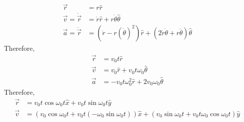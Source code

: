 \documentclass[fleqn]{article}
\begin{document}
\begin{align*}
\overrightarrow{r} &= r \hat{r} \\
\overrightarrow{v} = \dot{\overrightarrow{r}} &= \dot{r} \hat{r} + r \dot{\theta} \hat{\theta} \\
\overrightarrow{a} = \ddot{\overrightarrow{r}} &= \left(\ddot{r} - r(\dot{\theta})^2\right) \hat{r} + \left(2 \dot{r} \dot{\theta} + r \ddot{\theta}\right) \hat{\theta}
\end{align*}
Therefore,
\begin{align*}
	\overrightarrow{r} &= v_0 t \hat{r} \\
	\overrightarrow{v} &= v_0 \hat{r} + v_0 t \omega_0 \hat{\theta} \\
	\overrightarrow{a} &= - v_0 t \omega_0^2 \hat{r} + 2 v_0 \omega_0 \hat{\theta}
\end{align*}
Therefore, 
\begin{align*}
	\overrightarrow{r} &= v_0 t \cos \omega_0 t \hat{x} + v_0 t \sin \omega_0 t \hat{y} \\
	\overrightarrow{v} &= \left(v_0 \cos \omega_0 t + v_0 t (- \omega_0 \sin \omega_0 t)\right) \hat{x} + \left(v_0 \sin \omega_0 t + v_0 t  \omega_0 \cos \omega_0 t\right) \hat{y}
\end{align*}
\end{document}
